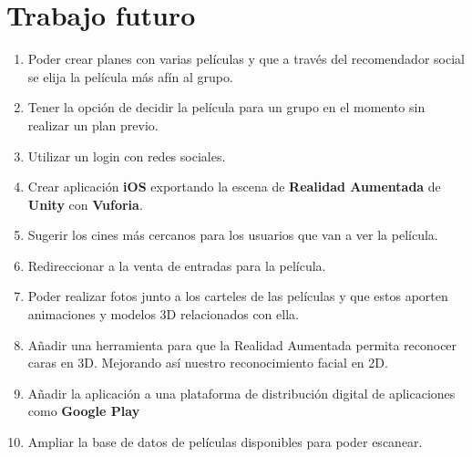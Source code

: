 
\cleardoublepage


\chapter{Trabajo futuro}
\label{makereference6}

\begin{enumerate}  
    \item Poder crear planes con varias películas y que a través del recomendador social se elija la película más afín al grupo.
    \item Tener la opción de decidir la película para un grupo en el momento sin realizar un plan previo.
    \item Utilizar un login con redes sociales.
    \item Crear aplicación \textbf{iOS} exportando la escena de \textbf{Realidad Aumentada} de \textbf{Unity} con \textbf{Vuforia}.
    \item Sugerir los cines más cercanos para los usuarios que van a ver la película.
    \item Redireccionar a la venta de entradas para la película.
    \item Poder realizar fotos junto a los carteles de las películas y que estos aporten animaciones y modelos 3D relacionados con ella.
    \item Añadir una herramienta para que la Realidad Aumentada permita reconocer caras en 3D. Mejorando así nuestro reconocimiento facial en 2D.
    \item Añadir la aplicación a una plataforma de distribución digital de aplicaciones como \textbf{Google Play}
    \item Ampliar la base de datos de películas disponibles para poder escanear.
\end{enumerate}